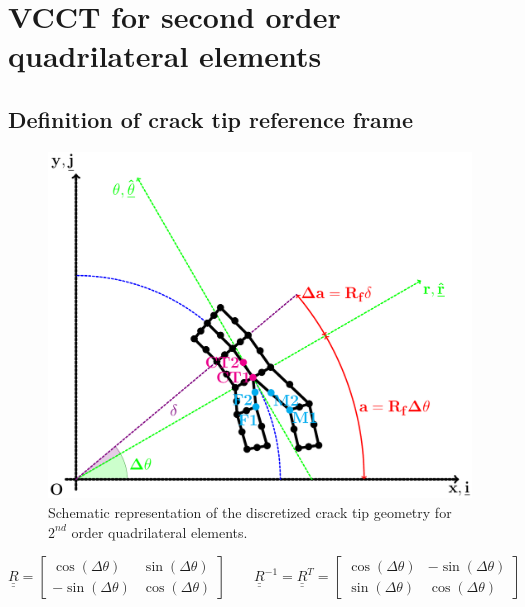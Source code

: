 \documentclass[a4paper]{jpconf}
\begin{document}
\clearpage


\section{VCCT for second order quadrilateral elements}

\subsection{Definition of crack tip reference frame}

\begin{figure}[!h]
\includegraphics[width=\textwidth]{VCCT-quadratic.pdf}
\caption{Schematic representation of the discretized crack tip geometry for $2^{nd}$ order quadrilateral elements.}
\end{figure}

\begin{equation}
\underline{\underline{R}}=\begin{bmatrix}
\cos\left(\Delta\theta\right) & \sin\left(\Delta\theta\right) \\
-\sin\left(\Delta\theta\right) & \cos\left(\Delta\theta\right)
\end{bmatrix}\qquad\underline{\underline{R}}^{-1}=\underline{\underline{R}}^{T}=\begin{bmatrix}
\cos\left(\Delta\theta\right) & -\sin\left(\Delta\theta\right) \\
\sin\left(\Delta\theta\right) & \cos\left(\Delta\theta\right)
\end{bmatrix}
\end{equation}
\end{document}
